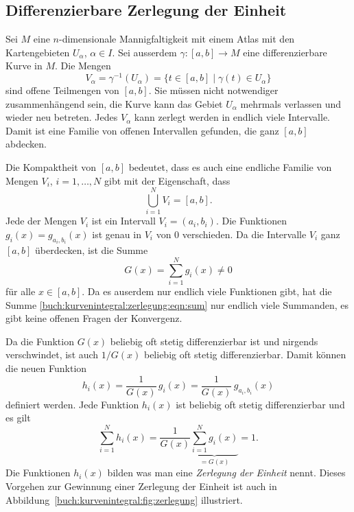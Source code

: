 \subsection{Differenzierbare Zerlegung der Einheit
\label{buch:kurvenintegral:zerlegug:subsection:dze}}
Sei $M$ eine $n$-dimensionale Mannigfaltigkeit mit einem Atlas mit
den Kartengebieten $U_\alpha$, $\alpha\in I$.
Sei ausserdem $\gamma\colon [a,b]\to M$ eine differenzierbare
Kurve in $M$.
Die Mengen
\[
V_\alpha
=
\gamma^{-1}(U_\alpha)
=
\{
t\in[a,b]
\mid
\gamma(t)\in U_\alpha
\}
\]
sind offene Teilmengen von $[a,b]$.
Sie müssen nicht notwendiger zusammenhängend sein, die Kurve kann
das Gebiet $U_\alpha$ mehrmals verlassen und wieder neu betreten.
Jedes $V_\alpha$ kann zerlegt werden in endlich viele Intervalle.
Damit ist eine Familie von offenen Intervallen gefunden, die ganz
$[a,b]$ abdecken.

Die Kompaktheit von $[a,b]$ bedeutet, dass es auch eine endliche
Familie von Mengen $V_i$, $i=1,\dots,N$ gibt mit der Eigenschaft,
dass
\[
\bigcup_{i=1}^N V_i = [a,b].
\]
Jede der Mengen $V_i$ ist ein Intervall $V_i=(a_i,b_i)$.
Die Funktionen $g_i(x) = g_{a_i,b_i}(x)$ ist genau in $V_i$
von $0$ verschieden.
Da die Intervalle $V_i$ ganz $[a,b]$ überdecken, ist die
Summe
\begin{equation}
G(x) = \sum_{i=1}^N g_i(x) \ne 0
\label{buch:kurvenintegral:zerlegung:eqn:sum}
\end{equation}
für alle $x\in[a,b]$.
Da es auserdem nur endlich viele Funktionen gibt, hat die Summe
\eqref{buch:kurvenintegral:zerlegung:eqn:sum}
nur endlich viele Summanden, es gibt keine offenen Fragen der
Konvergenz.

Da die Funktion $G(x)$ beliebig oft stetig differenzierbar ist
und nirgends verschwindet, ist auch $1/G(x)$ beliebig oft stetig
differenzierbar.
%
Damit können die neuen Funktion
\[
h_i(x)
=
\frac{1}{G(x)}\,g_i(x)
=
\frac{1}{G(x)}\,g_{a_i,b_i}(x)
\]
definiert werden.
Jede Funktion $h_i(x)$ ist beliebig oft stetig differenzierbar und
es gilt
\[
\sum_{i=1}^N h_i(x)
=
\frac{1}{G(x)}
\underbrace{\sum_{i=1}^N g_i(x)}_{\displaystyle=G(x)}
=
1.
\]
Die Funktionen $h_i(x)$ bilden was man eine {\em Zerlegung der Einheit}
nennt.
%
Dieses Vorgehen zur Gewinnung einer Zerlegung der Einheit ist auch
in Abbildung~\ref{buch:kurvenintegral:fig:zerlegung} illustriert.

%
%
